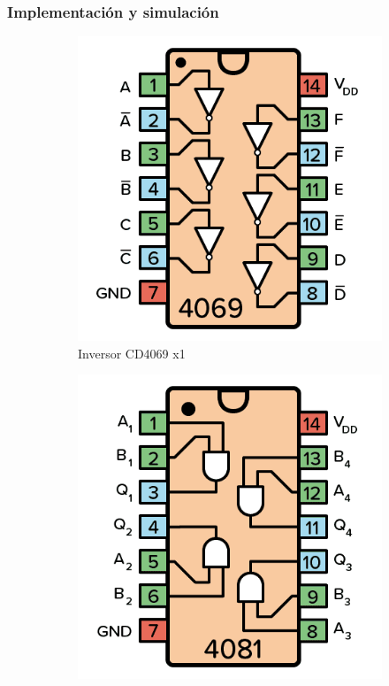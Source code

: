 \subsubsection{Implementación y simulación}
\begin{center}
\begin{figure}[h!]
\centering
\begin{subfigure}[b]{0.45\linewidth}
\includegraphics[width=\linewidth]{./imagenes/cd4069.png}
\caption{Inversor CD4069 x1}
\end{subfigure}
\begin{subfigure}[b]{0.45\linewidth}
\includegraphics[width=\linewidth]{./imagenes/cd4081.png}

\end{subfigure}
\end{figure}
\end{center}

